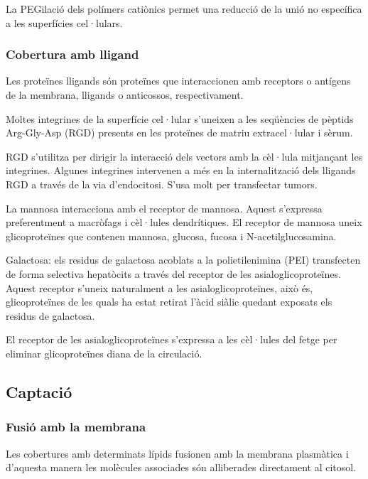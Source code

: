 La PEGilació dels polímers catiònics permet una reducció de la unió no específica a les superfícies cel·lulars.

\subsubsection{Cobertura amb lligand}
\label{sec:cobert-amb-llig}
Les proteïnes lligands són proteïnes que interaccionen amb receptors o antígens de la membrana, lligands o anticossos, respectivament.

Moltes integrines de la superfície cel·lular s'uneixen a les seqüències de pèptids Arg-Gly-Asp (RGD) presents en les proteïnes de matriu extracel·lular i sèrum.

RGD s'utilitza per dirigir la interacció dels vectors amb la cèl·lula mitjançant les integrines. Algunes integrines intervenen a més en la internalització dels lligands RGD a través de la via d'endocitosi. S'usa molt per transfectar tumors.

La mannosa interacciona amb el receptor de mannosa. Aquest s'expressa preferentment a macròfags i cèl·lules dendrítiques. El receptor de mannosa uneix glicoproteïnes que contenen mannosa, glucosa, fucosa i N-acetilglucosamina.

Galactosa: els residus de galactosa acoblats a la polietilenimina (PEI) transfecten de forma selectiva hepatòcits a través del receptor de les asialoglicoproteïnes. Aquest receptor s'uneix naturalment a les asialoglicoproteïnes, això és, glicoproteïnes de les quals ha estat retirat l'àcid siàlic quedant exposats els residus de galactosa.

El receptor de les asialoglicoproteïnes s'expressa a les cèl·lules del fetge per eliminar glicoproteïnes diana de la circulació.



\subsection{Captació}
\label{sec:captacio}

\subsubsection{Fusió amb la membrana}
\label{sec:fusio-amb-la}
Les cobertures amb determinats lípids fusionen amb la membrana plasmàtica i d'aquesta manera les molècules associades són alliberades directament al citosol.

